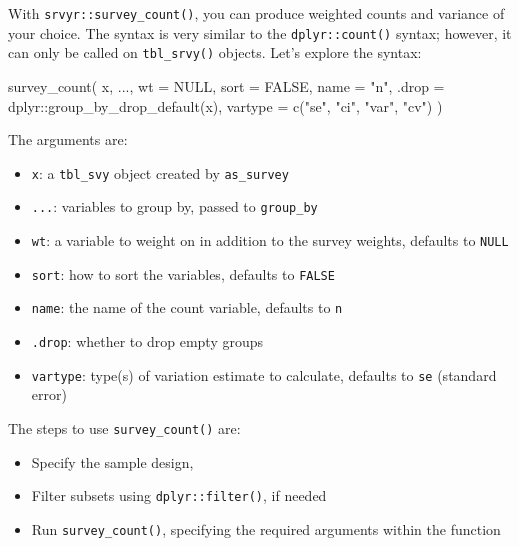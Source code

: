 \documentclass[
]{krantz}
\makeatletter
\newenvironment{Shaded}{\begin{snugshade}}{\end{snugshade}}
\newcommand{\AttributeTok}[1]{\textcolor[rgb]{0.61,0.61,0.61}{#1}}
\newcommand{\ConstantTok}[1]{\textcolor[rgb]{0,0,0}{#1}}
\newcommand{\FunctionTok}[1]{\textcolor[rgb]{0,0,0}{#1}}
\newcommand{\NormalTok}[1]{#1}
\newcommand{\SpecialCharTok}[1]{\textcolor[rgb]{0,0,0}{#1}}
\newcommand{\StringTok}[1]{\textcolor[rgb]{0.5,0.5,0.5}{#1}}
\providecommand{\tightlist}{%
  \setlength{\itemsep}{0pt}\setlength{\parskip}{0pt}}
\newenvironment{kframe}{%
\medskip{}
\setlength{\fboxsep}{.8em}
 \def\at@end@of@kframe{}%
 \ifinner\ifhmode%
  \def\at@end@of@kframe{\end{minipage}}%
  \begin{minipage}{\columnwidth}%
 \fi\fi%
 \def\FrameCommand##1{\hskip\@totalleftmargin \hskip-\fboxsep
 \colorbox{shadecolor}{##1}\hskip-\fboxsep
     \hskip-\linewidth \hskip-\@totalleftmargin \hskip\columnwidth}%
 \MakeFramed {\advance\hsize-\width
   \@totalleftmargin\z@ \linewidth\hsize
   \@setminipage}}%
 {\par\unskip\endMakeFramed%
 \at@end@of@kframe}
\renewenvironment{Shaded}{\begin{kframe}}{\end{kframe}}
\makeatother
\begin{document}
With \texttt{srvyr::survey\_count()}, you can produce weighted counts and variance of your choice. The syntax is very similar to the \texttt{dplyr::count()} syntax; however, it can only be called on \texttt{tbl\_srvy()} objects. Let's explore the syntax:

\begin{Shaded}
\begin{Highlighting}[]
\FunctionTok{survey\_count}\NormalTok{(}
\NormalTok{  x,}
\NormalTok{  ...,}
  \AttributeTok{wt =} \ConstantTok{NULL}\NormalTok{,}
  \AttributeTok{sort =} \ConstantTok{FALSE}\NormalTok{,}
  \AttributeTok{name =} \StringTok{"n"}\NormalTok{,}
  \AttributeTok{.drop =}\NormalTok{ dplyr}\SpecialCharTok{::}\FunctionTok{group\_by\_drop\_default}\NormalTok{(x),}
  \AttributeTok{vartype =} \FunctionTok{c}\NormalTok{(}\StringTok{"se"}\NormalTok{, }\StringTok{"ci"}\NormalTok{, }\StringTok{"var"}\NormalTok{, }\StringTok{"cv"}\NormalTok{)}
\NormalTok{  )}
\end{Highlighting}
\end{Shaded}

The arguments are:

\begin{itemize}
\tightlist
\item
  \texttt{x}: a \texttt{tbl\_svy} object created by \texttt{as\_survey}
\item
  \texttt{...}: variables to group by, passed to \texttt{group\_by}
\item
  \texttt{wt}: a variable to weight on in addition to the survey weights, defaults to \texttt{NULL}
\item
  \texttt{sort}: how to sort the variables, defaults to \texttt{FALSE}
\item
  \texttt{name}: the name of the count variable, defaults to \texttt{n}
\item
  \texttt{.drop}: whether to drop empty groups
\item
  \texttt{vartype}: type(s) of variation estimate to calculate, defaults to \texttt{se} (standard error)
\end{itemize}

The steps to use \texttt{survey\_count()} are:

\begin{itemize}
\tightlist
\item
  Specify the sample design,
\item
  Filter subsets using \texttt{dplyr::filter()}, if needed
\item
  Run \texttt{survey\_count()}, specifying the required arguments within the function
\end{itemize}
\end{document}
